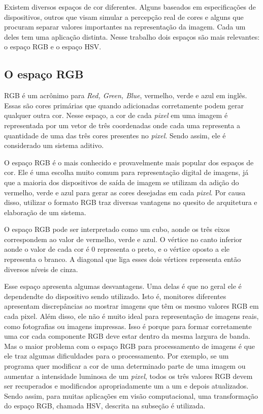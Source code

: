      Existem diversos espaços de cor diferentes. Alguns baseados em especificações de dispositivos, outros que visam simular a percepção real de cores e alguns que procuram separar valores importantes na representação da imagem. Cada um deles tem uma aplicação distinta. Nesse trabalho dois espaços são mais relevantes: o espaço RGB e o espaço HSV.

     \subsection{O espaço RGB}\label{RGB}

     RGB é um acrônimo para \textit{Red, Green, Blue}, vermelho, verde e azul em inglês. Essas são cores primárias que quando adicionadas corretamente podem gerar qualquer outra cor. Nesse espaço, a cor de cada \textit{pixel} em uma imagem é representada por um vetor de três coordenadas onde cada uma representa a quantidade de uma das três cores presentes no \textit{pixel}. Sendo assim, ele é considerado um sistema aditivo.

     O espaço RGB é o mais conhecido e provavelmente mais popular dos espaços de cor. Ele é uma escolha muito comum para representação digital de imagens, já que a maioria dos dispositivos de saída de imagem se utilizam da adição do vermelho, verde e azul para gerar as cores desejadas em cada \textit{pixel}. Por causa disso, utilizar o formato RGB traz diversas vantagens no quesito de arquitetura e elaboração de um sistema.

     O espaço RGB pode ser interpretado como um cubo, aonde os três eixos correspondem ao valor de vermelho, verde e azul.  O vértice no canto inferior aonde o valor de cada cor é 0 representa o preto, e o vértice oposto a ele representa o branco.\cite{ford1998colour} A diagonal que liga esses dois vértices representa então diversos níveis de cinza.

     Esse espaço apresenta algumas desvantagens. Uma delas é que no geral ele é dependendte do dispositivo sendo utilizado. Isto é, monitores diferentes apresentam discrepâncias ao mostrar imagens que têm os mesmo valores RGB em cada pixel. Além disso, ele não é muito ideal para representação de imagens reais, como fotografias ou imagens impressas. Isso é porque para formar corretamente uma cor cada componente RGB deve estar dentro da mesma largura de banda. Mas o maior problema com o espaço RGB para processamento de imagens é que ele traz algumas dificuldades para o processamento. Por exemplo, se um programa quer modificar a cor de uma determinado parte de uma imagem ou aumentar a intensidade luminosa de um \textit{pixel}, todos os três valores RGB devem ser recuperados e modificados apropriadamente um a um e depois atualizados. Sendo assim, para muitas aplicações em visão computacional, uma transformação do espaço RGB, chamada HSV, descrita na subseção \label{HSV} é utilizada.

